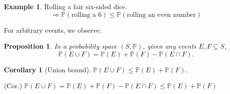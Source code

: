 \documentclass[a4paper,11pt]{amsbook}
\makeatletter
\renewenvironment{proof}[1][\proofname]{\par
    \pushQED{\qed}%
    \normalfont \topsep6\p@\@plus6\p@\relax
    \trivlist
    \itemindent\z@ %
    \item[\hskip\labelsep
          \scshape
      #1\@addpunct{.}]\ignorespaces
}{%
    \popQED\endtrivlist\@endpefalse
}
\newtheorem{proposition}{\hspace{-2em} \color{darkblue} Proposition}[chapter]
\newtheorem{corollary}{\hspace{-2em} \color{darkblue} Corollary}[chapter]
\theoremstyle{definition}
\newtheorem{example}{\hspace{-2em} \color{darkblue} Example}[chapter]
\theoremstyle{remark}
\renewcommand{\P}{\mathbb{P}}
\newcommand\inc\subseteq
\newcommand\0{\varnothing}
\makeatother
\begin{document}
    \begin{example}
        Rolling a fair six-sided dice.
        $$\Rightarrow\P(\text{rolling a 6})\leq\P(\text{rolling an even number})$$
    \end{example}

    For arbitrary events, we observe: \begin{center}
    \end{center}
    
    \begin{proposition}
        In a probability space $(S,\P)$, given any events $E,F\inc S$, $$\P(E\cup F)=\P(E)+\P(F)-\P(E\cap F).$$
    \end{proposition}

    \begin{corollary}[Union bound] $\P(E\cup F)\leq\P(E)+\P(F)$.
    \end{corollary}
    \begin{proof} (Cor.)
        $\P(E\cup F)=\P(E)+\P(F)-\P(E\cap F)\leq\P(E)+\P(F)$
    \end{proof}
\end{document}
